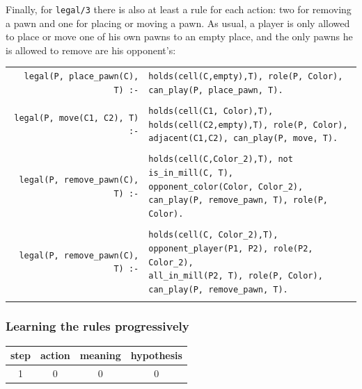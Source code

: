 \bigskip

Finally, for \texttt{legal/3} there is also at least a rule for each action: two for removing a pawn and one for placing or moving a pawn. As usual, a player is only allowed to place or move one of his own pawns to an empty place, and the only pawns he is allowed to remove are his opponent's:

\bigskip



\begin{tabular}{rl}
\texttt{legal(P, place\_pawn(C), T) :-} & 
\makecell[tl]{
\texttt{holds(cell(C,empty),T), role(P, Color),}\\
\texttt{can\_play(P, place\_pawn, T).}
} \\\\

\texttt{legal(P, move(C1, C2), T) :-} & 
\makecell[tl]{
\texttt{holds(cell(C1, Color),T),}\\
\texttt{holds(cell(C2,empty),T), role(P, Color),}\\
\texttt{adjacent(C1,C2), can\_play(P, move, T).}}\\\\

\texttt{legal(P, remove\_pawn(C), T) :-} & 
\makecell[tl]{
\texttt{holds(cell(C,Color\_2),T), not is\_in\_mill(C, T),}\\
\texttt{opponent\_color(Color, Color\_2),}\\
\texttt{can\_play(P, remove\_pawn, T), role(P, Color).}} \\\\

\texttt{legal(P, remove\_pawn(C), T) :-} & 
\makecell[tl]{
\texttt{holds(cell(C, Color\_2),T),}\\
\texttt{opponent\_player(P1, P2), role(P2, Color\_2),}\\
\texttt{all\_in\_mill(P2, T), role(P, Color),}\\
\texttt{can\_play(P, remove\_pawn, T).}
} \\\\
\end{tabular}


\subsubsection{Learning the rules progressively}

\begin{tabular}{c|c|c|c}
step & action & meaning & hypothesis \\
\hline
\hline
1 & 0 & 0 & 0\\
\hline
\end{tabular}


